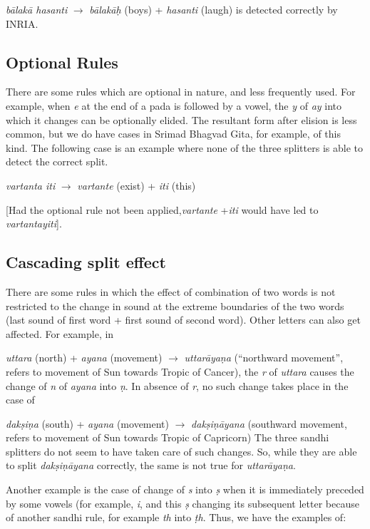 \documentclass[11pt]{article}
\begin{document}
            \textit{bālakā hasanti} $\rightarrow$ \textit{bālakāḥ} (boys) + \textit{hasanti} (laugh) is detected correctly by INRIA.                      

    
\subsection{Optional Rules}    
There are some rules which are optional in nature, and less frequently used. For example, when \textit{e} at the end of a pada is followed by a vowel, the \textit{y} of \textit{ay} into which it changes can be optionally elided. The resultant form after elision is less common, but we do have cases in Srimad Bhagvad Gita, for example, of this kind. The following case is an example where none of the three splitters is able to detect the correct split.
    
   \textit{ vartanta iti} $\rightarrow$ \textit{vartante} (exist) + \textit{iti} (this)
   
[Had the optional rule not been applied,\textit{vartante} +\textit{iti} would have led to \textit{vartantayiti}]. 

\subsection{Cascading split effect}
There are some rules in which the effect of combination of two words is not restricted to the change in sound at the extreme boundaries of the two words (last sound of first word + first sound of second word). Other letters can also get affected. For example, in 

       \textit{uttara} (north) + \textit{ayana} (movement) $\rightarrow$ \textit{uttarāyaṇa} (``northward movement'', refers to movement of Sun towards Tropic of Cancer), the \textit{r} of \textit{uttara} causes the change of \textit{n} of \textit{ayana} into \textit{ ṇ}. In absence of \textit{r}, no such change takes place in the case of 


\textit{dakṣiṇa} (south) + \textit{ayana} (movement) $\rightarrow$ \textit{dakṣiṇāyana} (southward movement, refers to movement of Sun towards Tropic of Capricorn) 
The three sandhi splitters do not seem to have taken care of such changes. So, while they are able to split \textit{dakṣiṇāyana} correctly, the same is not true for \textit{uttarāyaṇa}.

 Another example is the case of change of \textit{s} into \textit{ṣ} when it is immediately preceded by some vowels (for example, \textit{i}, and this \textit{ṣ} changing its subsequent letter because of another sandhi rule, for example  \textit{th} into \textit{ṭh}. Thus, we have the examples of:
 
\end{document}
